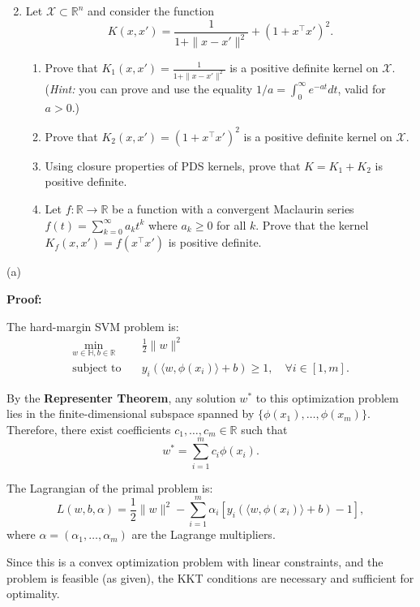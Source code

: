\documentclass[letterpaper, 11pt]{article}
\newcommand{\1}{\mathds{1}}	%
\theoremstyle{definition}
\begin{document}
\begin{enumerate}
\setcounter{enumi}{1}
\item Let $\mathcal{X} \subset \mathbb{R}^n$ and consider the function
\[
K(x, x') = \frac{1}{1 + \|x - x'\|^2} + (1 + x^\top x')^2.
\]

\begin{enumerate}
\item Prove that $K_1(x, x') = \frac{1}{1 + \|x - x'\|^2}$ is a positive definite kernel on $\mathcal{X}$. (\textit{Hint:} you can prove and use the equality $1/a = \int_0^\infty e^{-at} dt$, valid for $a > 0$.)

\item Prove that $K_2(x, x') = (1 + x^\top x')^2$ is a positive definite kernel on $\mathcal{X}$.

\item Using closure properties of PDS kernels, prove that $K = K_1 + K_2$ is positive definite.

\item Let $f: \mathbb{R} \to \mathbb{R}$ be a function with a convergent Maclaurin series $f(t) = \sum_{k=0}^\infty a_k t^k$ where $a_k \geq 0$ for all $k$. Prove that the kernel $K_f(x, x') = f(x^\top x')$ is positive definite.
\end{enumerate}
\end{enumerate}

(a) 

\textbf{Proof:}

The hard-margin SVM problem is:
\begin{align*}
\min_{w \in \mathbb{H}, b \in \mathbb{R}} \quad & \frac{1}{2}\|w\|^2 \\
\text{subject to} \quad & y_i(\langle w, \phi(x_i) \rangle + b) \geq 1, \quad \forall i \in [1, m].
\end{align*}

By the \textbf{Representer Theorem}, any solution $w^*$ to this optimization problem lies in the finite-dimensional subspace spanned by $\{\phi(x_1), \ldots, \phi(x_m)\}$. Therefore, there exist coefficients $c_1, \ldots, c_m \in \mathbb{R}$ such that
\[
w^* = \sum_{i=1}^m c_i \phi(x_i).
\]

The Lagrangian of the primal problem is:
\[
L(w, b, \alpha) = \frac{1}{2}\|w\|^2 - \sum_{i=1}^m \alpha_i [y_i(\langle w, \phi(x_i) \rangle + b) - 1],
\]
where $\alpha = (\alpha_1, \ldots, \alpha_m)$ are the Lagrange multipliers.

Since this is a convex optimization problem with linear constraints, and the problem is feasible (as given), the KKT conditions are necessary and sufficient for optimality.
\end{document}
